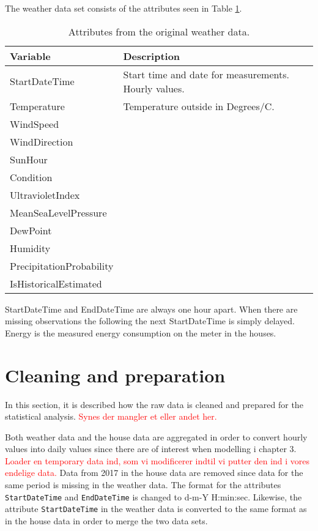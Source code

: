 The weather data set consists of the attributes seen in Table \ref{tab: weatherdata}.
\begin{table}[H]
    \centering
    \begin{tabular}{ll}
     \hline
     \textbf{Variable} & \textbf{Description} \\
    \hline
    \hline
    StartDateTime  &  Start time and date for measurements. Hourly values.\\
    Temperature  &  Temperature outside in Degrees/C. \\
    WindSpeed  &  \\
    WindDirection  &  \\
    SunHour  &  \\
    Condition  & \\
    UltravioletIndex  &   \\
    MeanSeaLevelPressure  & \\
    DewPoint  &  \\
    Humidity  &  \\
    PrecipitationProbability & \\
    IsHistoricalEstimated & \\
    \hline
    \end{tabular}
    \caption{Attributes from the original weather data.}
    \label{tab: weatherdata}
\end{table}   

StartDateTime and EndDateTime are always one hour apart. When there 
are missing observations the following the next StartDateTime is simply delayed.
Energy is the measured energy consumption on the meter in the houses.


\section{Cleaning and preparation}
In this section, it is described how the raw data is cleaned and prepared for the statistical analysis. \textcolor{red}{Synes der mangler et eller andet her.}

Both weather data and the house data are aggregated in order to convert hourly values into daily values since there are of interest when modelling i chapter 3. 
\textcolor{red}{Loader en temporary data ind, som vi modificerer indtil vi putter den ind i vores endelige data.} Data from 2017 in the house data are removed since data for the same period is missing in the weather data. 
The format for the attributes \texttt{StartDateTime} and \texttt{EndDateTime} is changed to d-m-Y H:min:sec.
Likewise, the attribute \texttt{StartDateTime} in the weather data is converted to the same format as in the house data in order to merge the two data sets. 


